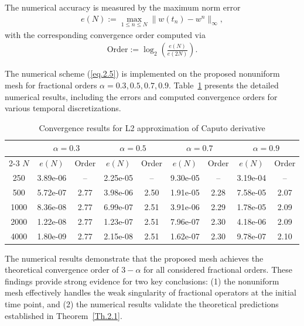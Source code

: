 \documentclass{siamart171218}
\theoremstyle{remark}
\theoremstyle{example}
\numberwithin{equation}{section}
\begin{document}
The numerical accuracy is measured by the maximum norm error
\begin{align*}
    e(N) := \max_{1\leq n \leq N} \|w(t_n) - w^n\|_\infty,
\end{align*}
with the corresponding convergence order computed via
\begin{align*}
    \text{Order} := \log_2\left(\frac{e(N)}{e(2N)}\right).
\end{align*}

The numerical scheme (\ref{eq.2.5}) is implemented on the proposed nonuniform mesh for fractional orders $\alpha =0.3, 0.5, 0.7, 0.9$. Table~\ref{table.5.1} presents the detailed numerical results, including the errors and computed convergence orders for various temporal discretizations.

\begin{table}[htbp]
\caption{Convergence results for L2 approximation of Caputo derivative}\label{table.5.1}
\begin{center}
\renewcommand{\arraystretch}{1.1}
\begin{tabular}{c|cc|cc|cc|cc}
&\multicolumn{2}{c|}{$\alpha=0.3$}
&\multicolumn{2}{c|}{$\alpha=0.5$}
&\multicolumn{2}{c|}{$\alpha=0.7$}
&\multicolumn{2}{c}{$\alpha=0.9$} \\
\cline{2-3} \cline{4-5} \cline{6-7}\cline{8-9}
$N$&$e(N)$ & Order &$e(N)$ & Order &$e(N)$ & Order &$e(N)$ & Order\\
\hline
250 &3.89e-06 &-- &2.25e-05 &-- &9.30e-05 &-- &3.19e-04 &-- \\
500 &5.72e-07 &2.77 &3.98e-06 &2.50 &1.91e-05 &2.28 &7.58e-05 &2.07\\
1000 &8.36e-08 &2.77 &6.99e-07 &2.51 &3.91e-06 &2.29 &1.78e-05 &2.09\\
2000 &1.22e-08 &2.77 &1.23e-07 &2.51 &7.96e-07 &2.30 &4.18e-06 &2.09\\
4000 &1.80e-09 &2.77 &2.15e-08 &2.51 &1.62e-07 &2.30 &9.78e-07 &2.10\\
\hline
\end{tabular}
\end{center}
\end{table}
The numerical results demonstrate that the proposed mesh achieves the theoretical convergence order of $3-\alpha$ for all considered fractional orders. These findings provide strong evidence for two key conclusions: (1) the nonuniform mesh effectively handles the weak singularity of fractional operators at the initial time point, and (2) the numerical results validate the theoretical predictions established in Theorem~\ref{Th.2.1}.
\end{document}
